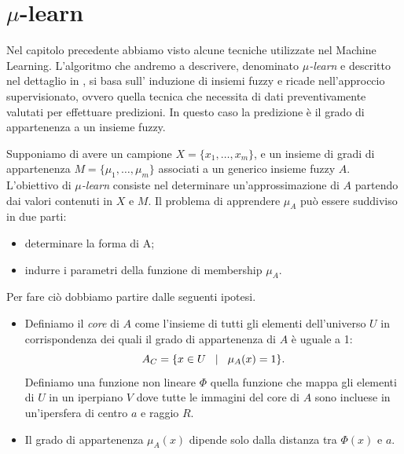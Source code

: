 \documentclass[a4paper,12pt]{report}
\begin{document}
\section{\texorpdfstring{$\mu$}{mu}-learn}
Nel capitolo precedente abbiamo visto alcune tecniche utilizzate nel Machine Learning. L’algoritmo che andremo a descrivere, denominato \textit{$\mu$-learn} e descritto nel dettaglio in \cite{mulearn}, si basa sull’ induzione di insiemi fuzzy e ricade nell’approccio supervisionato, ovvero quella tecnica che necessita di dati preventivamente valutati per effettuare predizioni. In questo caso la predizione è il grado di appartenenza a un insieme fuzzy.
\bigskip

Supponiamo di avere un campione $X = \{x_1,\dots,x_m\}$, e un insieme di gradi di appartenenza $ M = \{\mu_1,\dots,\mu_m\}$ associati a un generico insieme fuzzy $A$. L'obiettivo di \textit{$\mu$-learn} consiste nel determinare un'approssimazione di $A$ partendo dai valori contenuti in $X$ e $M$.
Il problema di apprendere $\mu_A$ può essere suddiviso in due parti:
\begin{itemize}
    \item determinare la forma di A;
    \item indurre i parametri della funzione di membership $\mu_A$.
\end{itemize}

\noindent Per fare ciò dobbiamo partire dalle seguenti ipotesi.
\begin{itemize}
    \item  Definiamo il \textit{core} di $A$ come l'insieme di tutti gli elementi dell'universo $U$ in corrispondenza dei quali il grado di appartenenza di $A$ è uguale a 1:
    \begin{equation*}
        A_C = \{ x\in U \hspace{0,3cm} |\hspace{0,3cm} \mu_A(x) = 1 \}.
    \end{equation*}
    \noindent Definiamo una funzione non lineare $\Phi$ quella funzione che mappa gli elementi di $U$ in un iperpiano $V$ dove tutte le immagini del core di $A$ sono incluese in un'ipersfera di centro $a$ e raggio $R$.

    \item Il grado di appartenenza $\mu_A(x)$ dipende solo dalla distanza tra $\Phi(x)$ e $a$.
\end{itemize}
\end{document}
